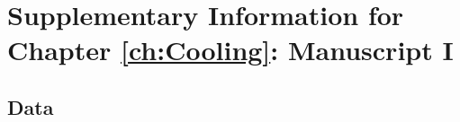 \chapter{Supplementary Information for Chapter \ref{ch:Cooling}: Manuscript I}
\label{appendix: Cooling}
\acresetall

\section{Data}
